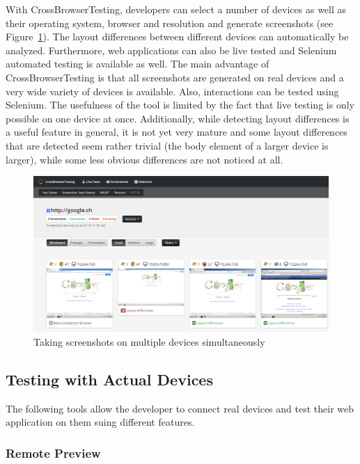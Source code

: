 With CrossBrowserTesting, developers can select a number of devices as well as their operating system, browser and resolution and generate screenshots (see Figure~\ref{fig:crossbrowsertesting}). The layout differences between different devices can automatically be analyzed. Furthermore, web applications can also be live tested and Selenium automated testing is available as well. The main advantage of CrossBrowserTesting is that all screenshots are generated on real devices and a very wide variety of devices is available. Also, interactions can be tested using Selenium. The usefulness of the tool is limited by the fact that live testing is only possible on one device at once. Additionally, while detecting layout differences is a useful feature in general, it is not yet very mature and some layout differences that are detected seem rather trivial (the body element of a larger device is larger), while some less obvious differences are not noticed at all. 

\begin{figure}[H]
  \centering
    \includegraphics[width=1.0\textwidth]{images/relatedwork/cross_browser_testing_2.png}
	\caption[Screenshot: CrossBrowserTesting]{Taking screenshots on multiple devices simultaneously}
	\label{fig:crossbrowsertesting}
\end{figure}

\subsection{Testing with Actual Devices}

The following tools allow the developer to connect real devices and test their web application on them suing different features.

\subsubsection{Remote Preview}

